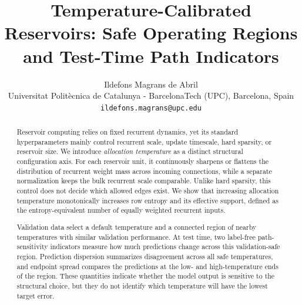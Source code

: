 \documentclass[11pt,a4paper]{article}
\title{Temperature-Calibrated Reservoirs: Safe Operating Regions and Test-Time Path Indicators}
\author{Ildefons Magrans de Abril\\
Universitat Polit\`ecnica de Catalunya - BarcelonaTech (UPC), Barcelona, Spain\\
\texttt{ildefons.magrans@upc.edu}}
\date{}
\begin{document}
\maketitle


\begin{abstract}
Reservoir computing relies on fixed recurrent dynamics, yet its standard hyperparameters mainly control recurrent scale, update timescale, hard sparsity, or reservoir size. We introduce \emph{allocation temperature} as a distinct structural configuration axis. For each reservoir unit, it continuously sharpens or flattens the distribution of recurrent weight mass across incoming connections, while a separate normalization keeps the bulk recurrent scale comparable. Unlike hard sparsity, this control does not decide which allowed edges exist. We show that increasing allocation temperature monotonically increases row entropy and its effective support, defined as the entropy-equivalent number of equally weighted recurrent inputs.

Validation data select a default temperature and a connected region of nearby temperatures with similar validation performance. At test time, two label-free path-sensitivity indicators measure how much predictions change across this validation-safe region. Prediction dispersion summarizes disagreement across all safe temperatures, and endpoint spread compares the predictions at the low- and high-temperature ends of the region. These quantities indicate whether the model output is sensitive to the structural choice, but they do not identify which temperature will have the lowest target error.


\end{abstract}
\end{document}
